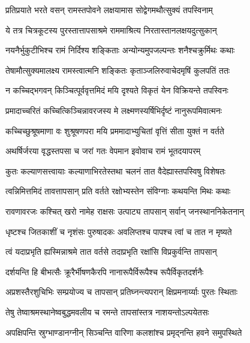 
\twolineshloka
{प्रतिप्रयाते भरते वसन् रामस्तपोवने}
{लक्षयामास सोद्वेगमथौत्सुक्यं तपस्विनाम्} %

\twolineshloka
{ये तत्र चित्रकूटस्य पुरस्तात्तापसाश्रमे}
{राममाश्रित्य निरतास्तानलक्षयदुत्सुकान्} %

\twolineshloka
{नयनैर्भुकुटीभिश्च रामं निर्दिश्य शङ्किताः}
{अन्योन्यमुपजल्पन्तः शनैश्चक्रुर्मिथः कथाः} %

\twolineshloka
{तेषामौत्सुक्यमालक्ष्य रामस्त्वात्मनि शङ्कितः}
{कृताञ्जलिरुवाचेदमृषिं कुलपतिं ततः} %

\twolineshloka
{न कच्चिद्भगवन् किञ्चित्पूर्ववृत्तमिदं मयि}
{दृश्यते विकृतं येन विक्रियन्ते तपस्विनः} %

\twolineshloka
{प्रमादाच्चरितं कच्चित्किञ्चिन्नावरजस्य मे}
{लक्ष्मणस्यर्षिभिर्दृष्टं नानुरूपमिवात्मनः} %

\twolineshloka
{कच्चिच्छुश्रूषमाणा वः शुश्रूषणपरा मयि}
{प्रममादाभ्युचितां वृत्तिं सीता युक्तं न वर्तते} %

\twolineshloka
{अथर्षिर्जरया वृद्धस्तपसा च जरां गतः}
{वेपमान इवोवाच रामं भूतदयापरम्} %

\twolineshloka
{कुतः कल्याणसत्त्वायाः कल्याणाभिरतेस्तथा}
{चलनं तात वैदेह्यास्तपस्विषु विशेषतः} %

\twolineshloka
{त्वन्निमित्तमिदं तावत्तापसान् प्रति वर्तते}
{रक्षोभ्यस्तेन संविग्नाः कथयन्ति मिथः कथाः} %

\twolineshloka
{रावणावरजः कश्चित् खरो नामेह राक्षसः}
{उत्पाट्य तापसान् सर्वान् जनस्थाननिकेतनान्} %

\twolineshloka
{धृष्टश्च जितकाशीं च नृशंसः पुरुषादकः}
{अवलिप्तश्च पापश्च त्वां च तात न मृष्यते} %

\twolineshloka
{त्वं यदाप्रभृति ह्यस्मिन्नाश्रमे तात वर्तसे}
{तदाप्रभृति रक्षांसि विप्रकुर्वन्ति तापसान्} %

\twolineshloka
{दर्शयन्ति हि बीभत्सैः क्रूरैर्भीषणकैरपि}
{नानारूपैर्विरूपैश्च रूपैर्विकृतदर्शनैः} %

\twolineshloka
{अप्रशस्तैरशुचिभिः सम्प्रयोज्य च तापसान्}
{प्रतिघ्नन्त्यपरान् क्षिप्रमनार्य्याः पुरतः स्थिताः} %

\twolineshloka
{तेषु तेष्वाश्रमस्थानेष्वबुद्धमवलीय च}
{रमन्ते तापसांस्तत्र नाशयन्तोऽल्पयेतसः} %

\twolineshloka
{अपक्षिपन्ति स्रुग्भाण्डानग्नीन् सिञ्चन्ति वारिणा}
{कलशांश्च प्रमृद्नन्ति हवने समुपस्थिते} %

